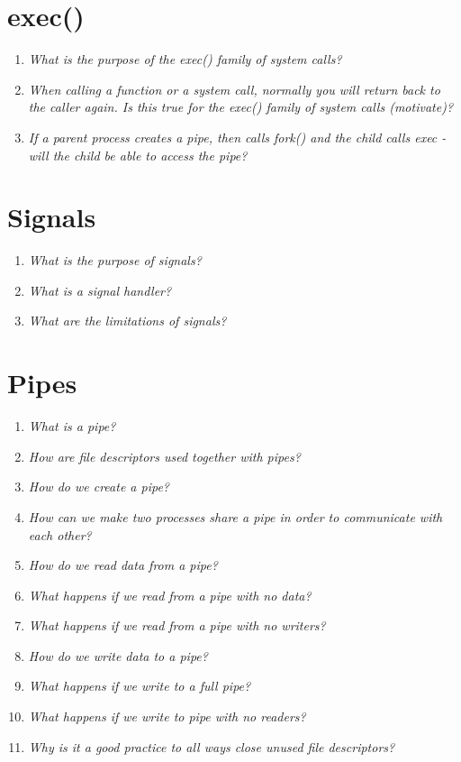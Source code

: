 \documentclass[a4paper]{article}
\begin{document}
\section{exec()}
\begin{enumerate}
  \item \textit{What is the purpose of the exec() family of system calls?}
  \item \textit{When calling a function or a system call, normally you will return back to the caller again. Is this true for the exec() family of system calls (motivate)?}
  \item \textit{If a parent process creates a pipe, then calls fork() and the child calls exec - will the child be able to access the pipe?}

\end{enumerate}

\section{Signals}
\begin{enumerate}
  \item \textit{What is the purpose of signals?}
  \item \textit{What is a signal handler?}
  \item \textit{What are the limitations of signals?}
\end{enumerate}

\section{Pipes}
\begin{enumerate}
  \item \textit{What is a pipe?}
  \item \textit{How are file descriptors used together with pipes?}
  \item \textit{How do we create a pipe?}
  \item \textit{How can we make two processes share a pipe in order to communicate with each other?}
  \item \textit{How do we read data from a pipe?}
  \item \textit{What happens if we read from a pipe with no data?}
  \item \textit{What happens if we read from a pipe with no writers?}
  \item \textit{How do we write data to a pipe?}
  \item \textit{What happens if we write to a full pipe?}
  \item \textit{What happens if we write to pipe with no readers?}
  \item \textit{Why is it a good practice to all ways close unused file descriptors?}
\end{enumerate}
\end{document}
